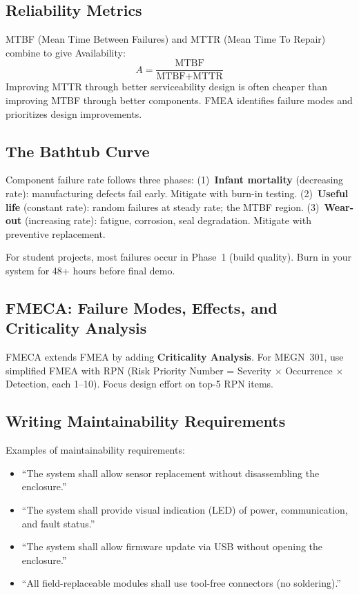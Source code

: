 \documentclass[11pt,letterpaper,twoside,openany]{book}
\begin{document}
\subsection{Reliability Metrics}
MTBF (Mean Time Between Failures) and MTTR (Mean Time To Repair) combine to give Availability:
\[
A = \frac{\text{MTBF}}{\text{MTBF} + \text{MTTR}}
\]
Improving MTTR through better serviceability design is often cheaper than improving MTBF through better components. FMEA identifies failure modes and prioritizes design improvements.


\subsection{The Bathtub Curve}
Component failure rate follows three phases: (1)~\textbf{Infant mortality} (decreasing rate): manufacturing defects fail early. Mitigate with burn-in testing. (2)~\textbf{Useful life} (constant rate): random failures at steady rate; the MTBF region. (3)~\textbf{Wear-out} (increasing rate): fatigue, corrosion, seal degradation. Mitigate with preventive replacement.

For student projects, most failures occur in Phase~1 (build quality). Burn in your system for 48+ hours before final demo.

\subsection{FMECA: Failure Modes, Effects, and Criticality Analysis}
FMECA extends FMEA by adding \textbf{Criticality Analysis}. For MEGN~301, use simplified FMEA with RPN (Risk Priority Number = Severity $\times$ Occurrence $\times$ Detection, each 1--10). Focus design effort on top-5 RPN items.

\subsection{Writing Maintainability Requirements}
Examples of maintainability requirements:
\begin{itemize}[nosep,leftmargin=1.5em]
\item ``The system shall allow sensor replacement without disassembling the enclosure.''
\item ``The system shall provide visual indication (LED) of power, communication, and fault status.''
\item ``The system shall allow firmware update via USB without opening the enclosure.''
\item ``All field-replaceable modules shall use tool-free connectors (no soldering).''
\end{itemize}
\end{document}
